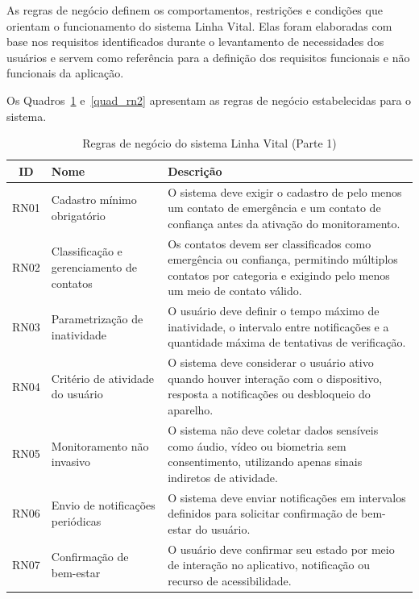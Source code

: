 As regras de negócio definem os comportamentos, restrições e condições que orientam o funcionamento do sistema Linha Vital. Elas foram elaboradas com base nos requisitos identificados durante o levantamento de necessidades dos usuários e servem como referência para a definição dos requisitos funcionais e não funcionais da aplicação.

Os Quadros~\ref{quad_rn1} e~\ref{quad_rn2} apresentam as regras de negócio estabelecidas para o sistema.

\begin{table}[H]
\caption{Regras de negócio do sistema Linha Vital (Parte 1)}
\label{quad_rn1}
\centering

\begin{tabular}{|c|p{4cm}|p{8cm}|}
\hline
\textbf{ID} & \textbf{Nome} & \textbf{Descrição} \\
\hline

RN01 & Cadastro mínimo obrigatório &
O sistema deve exigir o cadastro de pelo menos um contato de emergência e um contato de confiança antes da ativação do monitoramento. \\
\hline

RN02 & Classificação e gerenciamento de contatos &
Os contatos devem ser classificados como emergência ou confiança, permitindo múltiplos contatos por categoria e exigindo pelo menos um meio de contato válido. \\
\hline

RN03 & Parametrização de inatividade &
O usuário deve definir o tempo máximo de inatividade, o intervalo entre notificações e a quantidade máxima de tentativas de verificação. \\
\hline

RN04 & Critério de atividade do usuário &
O sistema deve considerar o usuário ativo quando houver interação com o dispositivo, resposta a notificações ou desbloqueio do aparelho. \\
\hline

RN05 & Monitoramento não invasivo &
O sistema não deve coletar dados sensíveis como áudio, vídeo ou biometria sem consentimento, utilizando apenas sinais indiretos de atividade. \\
\hline

RN06 & Envio de notificações periódicas &
O sistema deve enviar notificações em intervalos definidos para solicitar confirmação de bem-estar do usuário. \\
\hline

RN07 & Confirmação de bem-estar &
O usuário deve confirmar seu estado por meio de interação no aplicativo, notificação ou recurso de acessibilidade. \\
\hline


\end{tabular}
\end{table}
